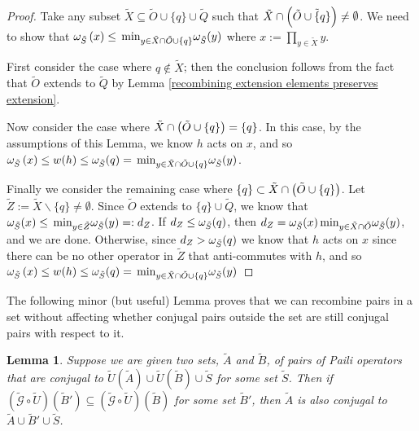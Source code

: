 \documentclass[twocolumn,showpacs,preprintnumbers,amsmath,amssymb,nofootinbib,pra,floatfix]{revtex4-1}
\newtheorem{lemma}{Lemma}
\newenvironment{remark}[1][Remark]{\begin{trivlist}
\item[\hskip \labelsep {\bfseries #1}]}{\end{trivlist}}
\newcommand{\set}{\tilde}
\newcommand{\genfun}{\tilde{\mathcal{G}}}
\begin{document}
\begin{proof}
Take any subset $\set X\subseteq \set O\cup\{q\}\cup\set Q$ such that $\set X\cap\paren{\set O\cup\set \{q\}}\ne\emptyset$.  We need to show that $\om_{\set S}\paren{x} \le \min_{y\in\set X\cap\set O\cup\{q\}}\om_{\set S}(y)$ where $x:=\prod_{y\in \set X} y$.

First consider the case where $q\notin \set X$;  then the conclusion follows from the fact that $\set O$ extends to $\set Q$ by Lemma \ref{recombining extension elements preserves extension}.

Now consider the case where $\set X\cap\paren{\set O\cup\{q\}}=\{q\}$.  In this case, by the assumptions of this Lemma, we know $h$ acts on $x$, and so $\om_{\set S}\paren{x} \le w(h)\le\om_{\set S}(q)=\min_{y\in\set X\cap\set O\cup\{q\}}\om_{\set S}(y)$.

Finally we consider the remaining case where $\{q\}\subset\set X\cap\paren{\set O\cup\{q\}}$. Let $\set Z := \set X\backslash\{q\}\ne\emptyset$.  Since $\set O$ extends to $\{q\}\cup\set Q$, we know that $\om_{\set S}(x)\le \min_{y\in\set Z}\om_{\set S}(y)=:d_Z$.  If $d_Z \le \om_{\set S}(q)$, then $d_Z=\om_{\set S}(x)\min_{y\in\set X\cap\set O}\om_{\set S}(y)$, and we are done.  Otherwise, since $d_Z> \om_{\set S}(q)$ we know that $h$ acts on $x$ since there can be no other operator in $\set Z$ that anti-commutes with $h$, and so $\om_{\set S}\paren{x} \le w(h)\le\om_{\set S}(q)=\min_{y\in\set X\cap\set O\cup\{q\}}\om_{\set S}(y)$
\end{proof}
\begin{remark}
The following minor (but useful) Lemma proves that we can recombine pairs in a set without affecting whether conjugal pairs outside the set are still conjugal pairs with respect to it.
\end{remark}

\begin{lemma}
\label{recombining elements preserves conjugal property for third parties}
Suppose we are given two sets, $\set A$ and $\set B$, of pairs of Paili operators that are conjugal to $\set U(\set A) \cup \set U(\set B) \cup \set S$ for some set $\set S$.  Then if $(\genfun\circ \set U)(\set B')\subseteq(\genfun\circ \set U)(\set B)$ for some set $\set B'$, then $\set A$ is also conjugal to $\set A \cup \set B' \cup\set S$.
\end{lemma}
\end{document}
